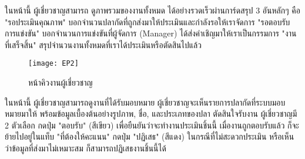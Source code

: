\indent ในหน้านี้ ผู้เชี่ยวชาญสามารถ ดูภาพรวมของงานทั้งหมด ได้อย่างรวดเร็วผ่านการ์ดสรุป 3 อันหลักๆ คือ 
"รอประเมินคุณภาพ" บอกจำนวนปลากัดที่ถูกส่งมาให้ประเมินและกำลังรอให้เราจัดการ
"รอตอบรับการแข่งขัน" บอกจำนวนการแข่งขันที่ผู้จัดการ (Manager) ได้ส่งคำเชิญมาให้เราเป็นกรรมการ
"งานที่เสร็จสิ้น" สรุปจำนวนงานทั้งหมดที่เราได้ประเมินหรือตัดสินไปแล้ว 

\vspace{\baselineskip}

\begin{figure}[h]
	\centering
	\texttt{[image: EP2]}
	\caption{หน้าคิวงานผู้เชี่ยวชาญ}
\end{figure}

\indent ในหน้านี้ ผู้เชี่ยวชาญสามารถดูงานที่ได้รับมอบหมาย ผู้เชี่ยวชาญจะเห็นรายการปลากัดที่ระบบมอบหมายมาให้ พร้อมข้อมูลเบื้องต้นอย่างรูปภาพ, ชื่อ, และประเภทของปลา ตัดสินใจรับงาน ผู้เชี่ยวชาญมี 2 ตัวเลือก กดปุ่ม "ตอบรับ" (สีเขียว) เพื่อยืนยันว่าจะทำงานประเมินชิ้นนี้ เมื่องานถูกตอบรับแล้ว ก็จะย้ายไปอยู่ในแท็บ "ที่ต้องให้คะแนน"
กดปุ่ม "ปฏิเสธ" (สีแดง) ในกรณีที่ไม่สะดวกประเมิน หรือเห็นว่าข้อมูลที่ส่งมาไม่เหมาะสม ก็สามารถปฏิเสธงานชิ้นนี้ได้

\endgroup